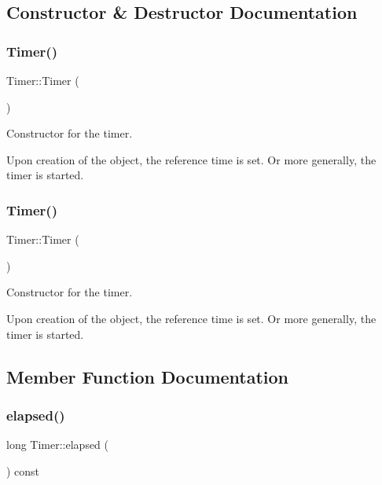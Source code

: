 \subsection{Constructor \& Destructor Documentation}
\mbox{\label{classTimer_a5f16e8da27d2a5a5242dead46de05d97}} 
\subsubsection{\texorpdfstring{Timer()}{Timer()}\hspace{0.1cm}{\footnotesize\ttfamily [1/2]}}
{\footnotesize\ttfamily Timer\+::\+Timer (\begin{DoxyParamCaption}{ }\end{DoxyParamCaption})}



Constructor for the timer. 

Upon creation of the object, the reference time is set. Or more generally, \textquotesingle{}the timer is started\textquotesingle{}. \mbox{\label{classTimer_a5f16e8da27d2a5a5242dead46de05d97}} 
\subsubsection{\texorpdfstring{Timer()}{Timer()}\hspace{0.1cm}{\footnotesize\ttfamily [2/2]}}
{\footnotesize\ttfamily Timer\+::\+Timer (\begin{DoxyParamCaption}{ }\end{DoxyParamCaption})}



Constructor for the timer. 

Upon creation of the object, the reference time is set. Or more generally, \textquotesingle{}the timer is started\textquotesingle{}. 

\subsection{Member Function Documentation}
\mbox{\label{classTimer_aa6e8575043cd8cd45754786e2f714c9a}} 
\subsubsection{\texorpdfstring{elapsed()}{elapsed()}\hspace{0.1cm}{\footnotesize\ttfamily [1/2]}}
{\footnotesize\ttfamily long Timer\+::elapsed (\begin{DoxyParamCaption}{ }\end{DoxyParamCaption}) const}



